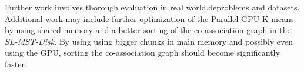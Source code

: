 \documentclass[a4paper,twoside]{article}
\begin{document}
Further work involves thorough evaluation in real world.deproblems and datasets.
Additional work may include further optimization of the Parallel GPU K-means by using shared memory and a better sorting of the co-association graph in the \emph{SL-MST-Disk}.
By using using bigger chunks in main memory and possibly even using the GPU, sorting the co-association graph should become significantly faster.



{\small
}

\vfill
\end{document}
